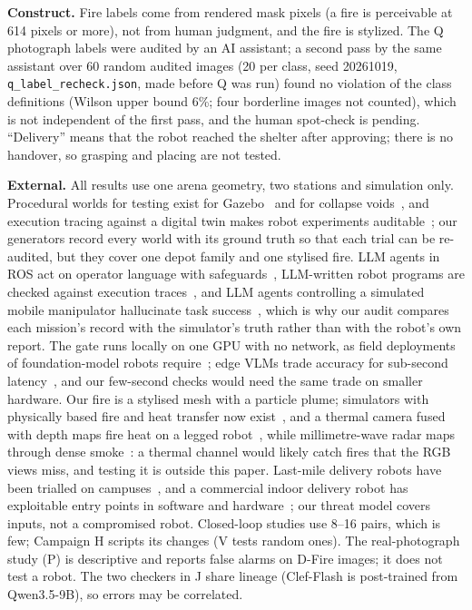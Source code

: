\documentclass[conference]{IEEEtran}
\begin{document}
\textbf{Construct.} Fire labels come from rendered mask pixels (a fire is perceivable at 614 pixels or more), not from human judgment, and the fire is
stylized. The Q photograph labels were audited by an AI assistant; a second pass by the same assistant over 60 random audited images (20 per class, seed 20261019, \texttt{q\_label\_recheck.json}, made before Q was run) found no violation of the class definitions (Wilson upper bound 6\%; four borderline images not counted), which is not independent of the first pass, and the human spot-check is pending. ``Delivery'' means that the robot reached the shelter after approving; there is no handover, so grasping and placing are not tested.

\textbf{External.} All results use one arena geometry, two stations and simulation only. Procedural worlds for testing exist for Gazebo~\cite{afzal2021gzscenic} and for collapse voids~\cite{frost2025rubblesim}, and execution tracing against a digital twin makes robot experiments auditable~\cite{alt2025digitaltwintracing}; our generators record every world with its ground truth so that each trial can be re-audited, but they cover one depot family and one stylised fire. LLM agents in ROS act on operator language with safeguards~\cite{royce2024rosa}, LLM-written robot programs are checked against execution traces~\cite{hu2023codebotler}, and LLM agents controlling a simulated mobile manipulator hallucinate task success~\cite{shaji2026languagetoaction}, which is why our audit compares each mission's record with the simulator's truth rather than with the robot's own report. The gate runs locally on one GPU with no network, as field deployments of foundation-model robots require~\cite{ravichandran2025fielddeploy}; edge VLMs trade accuracy for sub-second latency~\cite{ahmad2026edgevlm}, and our few-second checks would need the same trade on smaller hardware. Our fire is a stylised mesh with a particle plume; simulators with physically based fire and heat transfer now exist~\cite{wagner2026fireservice}, and a thermal camera fused with depth maps fire heat on a legged robot~\cite{wagner2026thermalfire}, while millimetre-wave radar maps through dense smoke~\cite{lu2019millimap}: a thermal channel would likely catch fires that the RGB views miss, and testing it is outside this paper. Last-mile delivery robots have been trialled on campuses~\cite{shaklab2023lastmile}, and a commercial indoor delivery robot has exploitable entry points in software and hardware~\cite{alshammari2024indoordelivery}; our threat model covers inputs, not a compromised robot. Closed-loop studies use 8--16 pairs, which is few; Campaign H scripts its changes (V tests random ones). The real-photograph study (P) is descriptive and
reports false alarms on D-Fire images; it does not test a robot. The two checkers in J share lineage (Clef-Flash is post-trained from
Qwen3.5-9B), so errors may be correlated.
\end{document}
